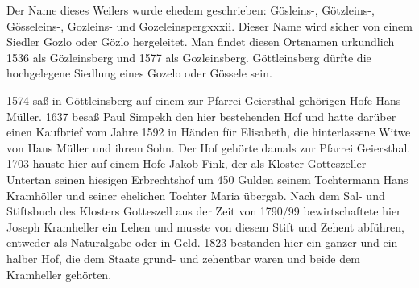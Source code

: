 \documentclass{book}
\begin{document}
Der Name dieses Weilers wurde ehedem geschrieben: Gösleins-, Götzleins-,
Gösseleins-, Gozleins- und Gozeleinspergxxxii. Dieser Name wird sicher von einem
Siedler Gozlo oder Gözlo hergeleitet. Man findet diesen Ortsnamen urkundlich
1536 als Gözleinsberg und 1577 als Gozleinsberg. Göttleinsberg dürfte die
hochgelegene Siedlung eines Gozelo oder Gössele sein.

1574 saß in Göttleinsberg auf einem zur Pfarrei Geiersthal gehörigen Hofe Hans
Müller. 1637 besaß Paul Simpekh den hier bestehenden Hof und hatte darüber einen
Kaufbrief vom Jahre 1592 in Händen für Elisabeth, die hinterlassene Witwe von
Hans Müller und ihrem Sohn. Der Hof gehörte damals zur Pfarrei Geiersthal. 1703
hauste hier auf einem Hofe Jakob Fink, der als Kloster Gotteszeller Untertan
seinen hiesigen Erbrechtshof um 450 Gulden seinem Tochtermann Hans Kramhöller
und seiner ehelichen Tochter Maria übergab. Nach dem Sal- und Stiftsbuch des
Klosters Gotteszell aus der Zeit von 1790/99 bewirtschaftete hier Joseph
Kramheller ein Lehen und musste von diesem Stift und Zehent abführen, entweder
als Naturalgabe oder in Geld. 1823 bestanden hier ein ganzer und ein halber Hof,
die dem Staate grund- und zehentbar waren und beide dem Kramheller gehörten.
\end{document}
